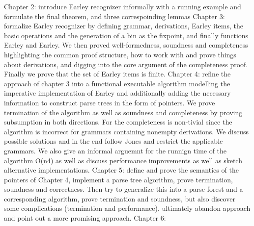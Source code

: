 %
\begin{isabellebody}%
%
%
\isadelimtheory
%
\endisadelimtheory
%
\isatagtheory
%
\endisatagtheory
{\isafoldtheory}%
%
\isadelimtheory
%
\endisadelimtheory
%
\isadelimdocument
%
\endisadelimdocument
%
\isatagdocument
%
\isamarkuptrue%
%
\isamarkuptrue%
%
\endisatagdocument
{\isafolddocument}%
%
\isadelimdocument
%
\endisadelimdocument
%
\begin{isamarkuptext}%
Chapter 2: introduce Earley recognizer informally with a running example and formulate the final theorem, and three correspoinding lemmas
Chapter 3: formalize Earley recognizer by defining grammar, derivations, Earley items, the basic operations and the generation of a bin
  as the fixpoint, and finally functions Earley and Earley. We then proved well-formedness, soundness and completeness highlighting
  the common proof structure, how to work with and prove things about derivations, and digging into the core argument of the completeness
  proof. Finally we prove that the set of Earley items is finite.
Chapter 4: refine the approach of chapter 3 into a functional executable algorithm modelling the imperative implementation of Earley and
  additionally adding the necessary information to construct parse trees in the form of pointers. We prove termination of the algorithm
  as well as soundness and completeness by proving subsumption in both directions. For the completeness is non-tivial since the algorithm
  is incorrect for grammars containing nonempty derivations. We discuss possible solutions and in the end follow Jones and restrict the
  applicable grammars. We also give an informal arguemnt for the runnign time of the algorithm O(n4) as well as discuss performance improvements as well as
  sketch alternative implementations.
Chapter 5: define and prove the semantics of the pointers of Chapter 4, implement a parse tree algorithm,
  prove termination, soundness and correctness. Then try to generalize this into a parse forest and a corresponding
  algorithm, prove termination and soundness, but also discover some complications (termination and performance),
  ultimately abandon approach and point out a more promising approach.
Chapter 6:


\end{isamarkuptext}
\end{isabellebody}
